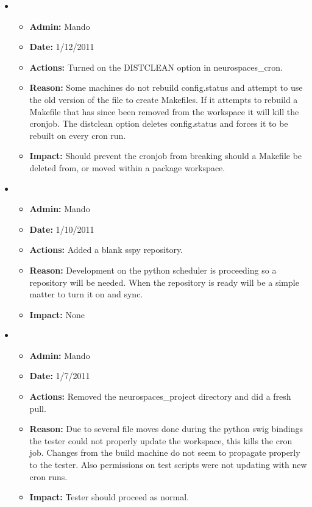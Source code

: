 \documentclass[12pt]{article}
\begin{document}
\begin{itemize}
\item
\begin{itemize}
\item[] {\bf Admin:} Mando
\item[] {\bf Date:} 1/12/2011 
\item[] {\bf Actions:} Turned on the DISTCLEAN option in neurospaces\_cron.
\item[] {\bf Reason:} Some machines do not rebuild config.status and attempt to use the old version of the file to create Makefiles. If it attempts to rebuild a Makefile that has since been removed from the workspace it will kill the cronjob. The distclean option deletes config.status and forces it to be rebuilt on every cron run. 
\item[] {\bf Impact:} Should prevent the cronjob from breaking should a Makefile be deleted from, or moved within a package workspace.
\end{itemize}

\item
\begin{itemize}
\item[] {\bf Admin:} Mando
\item[] {\bf Date:} 1/10/2011 
\item[] {\bf Actions:} Added a blank sspy repository.
\item[] {\bf Reason:} Development on the python scheduler is proceeding so a repository will be needed. When the repository is ready will be a simple matter to turn it on and sync. 
\item[] {\bf Impact:} None
\end{itemize}

\item
\begin{itemize}
\item[] {\bf Admin:} Mando
\item[] {\bf Date:} 1/7/2011 
\item[] {\bf Actions:} Removed the neurospaces\_project directory and did a fresh pull.
\item[] {\bf Reason:} Due to several file moves done during the python swig bindings the tester could not properly update the workspace, this kills the cron job. Changes from the build machine do not seem to propagate properly to the tester. Also permissions on test scripts were not updating with new cron runs.
\item[] {\bf Impact:} Tester should proceed as normal.
\end{itemize}



\end{itemize}
\end{document}
